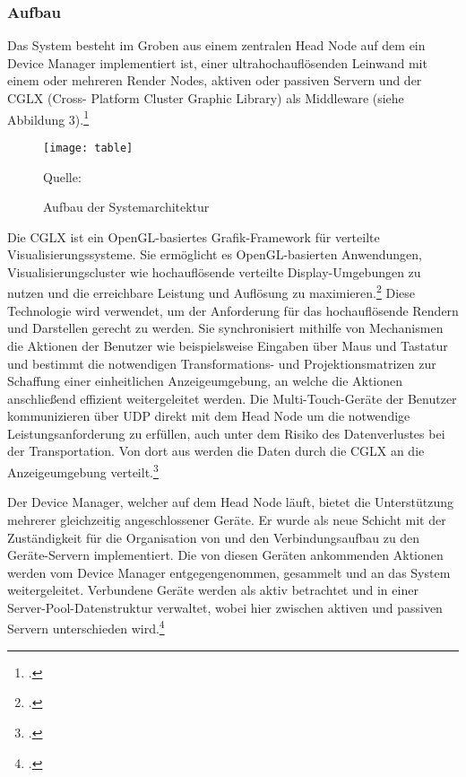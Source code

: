 \subsubsection{Aufbau}
Das System besteht im Groben aus einem zentralen Head Node auf dem ein Device Manager implementiert ist, einer ultrahochauflösenden Leinwand mit einem oder mehreren Render Nodes, aktiven oder passiven Servern und der CGLX (Cross-
Platform Cluster Graphic Library) als Middleware (siehe Abbildung 3).\footcite[Vgl.][Seite 651 f.]{Table}

\begin{figure}[H]
\begin{center}
\texttt{[image: table]}
\caption{Aufbau der Systemarchitektur}
Quelle: \cite[Seite 651]{Table}
\end{center}
\end{figure}
\vspace{-1cm}

Die CGLX ist ein OpenGL-basiertes Grafik-Framework für verteilte Visualisierungssysteme. Sie ermöglicht es OpenGL-basierten Anwendungen, Visualisierungscluster wie hochauflösende verteilte Display-Umgebungen zu nutzen und die erreichbare Leistung und Auflösung zu maximieren.\footcite[Vgl.][Seite 320]{CGLX} Diese Technologie wird verwendet, um der Anforderung für das hochauflösende Rendern und Darstellen gerecht zu werden. Sie synchronisiert mithilfe von Mechanismen die Aktionen der Benutzer wie beispielsweise Eingaben über Maus und Tastatur und bestimmt die notwendigen Transformations- und Projektionsmatrizen zur Schaffung einer einheitlichen Anzeigeumgebung, an welche die Aktionen anschließend effizient weitergeleitet werden. Die Multi-Touch-Geräte der Benutzer kommunizieren über UDP direkt mit dem Head Node um die notwendige Leistungsanforderung zu erfüllen, auch unter dem Risiko des Datenverlustes bei der Transportation. Von dort aus werden die Daten durch die CGLX an die Anzeigeumgebung verteilt.\footcite[Vgl.][Seite 651]{Table}

Der Device Manager, welcher auf dem Head Node läuft, bietet die Unterstützung mehrerer gleichzeitig angeschlossener Geräte. Er wurde als neue Schicht mit der Zuständigkeit für die Organisation von und den Verbindungsaufbau zu den Geräte-Servern implementiert. Die von diesen Geräten ankommenden Aktionen werden vom Device Manager entgegengenommen, gesammelt und an das System weitergeleitet. Verbundene Geräte werden als aktiv betrachtet und in einer Server-Pool-Datenstruktur verwaltet, wobei hier zwischen aktiven und passiven Servern unterschieden wird.\footcite[Vgl.][Seite 651]{Table}

